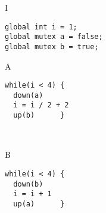 \documentclass{uebungsblatt}
\begin{document}
\begin{loesung}


\begin{minipage}[t]{.4\textwidth}
\program
I
\begin{lstlisting}
global int i = 1;
global mutex a = false;
global mutex b = true;
\end{lstlisting}
\end{minipage}

\smallskip
\begin{minipage}[t]{.4\textwidth}
\program
A
\begin{lstlisting}[firstnumber=4]
while(i < 4) {
  down(a)
  i = i / 2 + 2
  up(b)      }
\end{lstlisting}
\end{minipage}
\begin{minipage}[t]{.05\textwidth}
\mbox{~}
\end{minipage}
\begin{minipage}[t]{.4\textwidth}
\program
B
\begin{lstlisting}[firstnumber=8]
while(i < 4) {
  down(b)
  i = i + 1
  up(a)      }
\end{lstlisting}
\end{minipage}

\bigskip
\begin{center}
\resizebox{\linewidth}{!}{}
\end{center}
\end{loesung}
\end{document}
